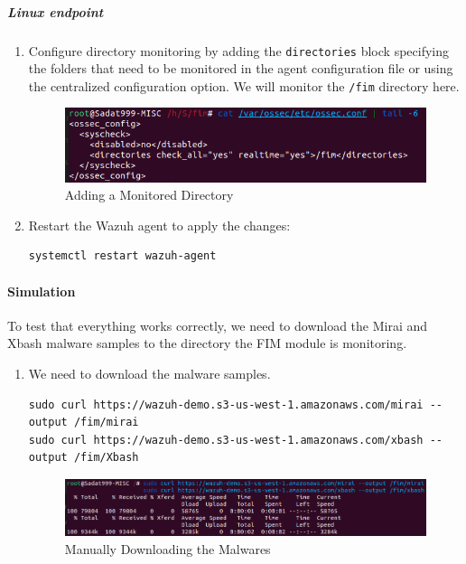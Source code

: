 \subparagraph{Linux endpoint}
\label{fim-source}
\begin{enumerate}
    \item Configure directory monitoring by adding the \texttt{\textlangle directories\textrangle} block specifying the folders that need to be monitored in the agent configuration file or using the centralized configuration option. We will monitor the \texttt{/fim} directory here.
    \begin{figure}[H]
        \centering
        \includegraphics[width=\textwidth]{images/malware-detection/cdb/5.png}
        \caption{Adding a Monitored Directory}
        \label{fig:monitored-dir}
    \end{figure}

    \item Restart the Wazuh agent to apply the changes:
    \begin{verbatim}
systemctl restart wazuh-agent
    \end{verbatim}
\end{enumerate}

\paragraph{Simulation}
To test that everything works correctly, we need to download the Mirai and Xbash malware samples to the directory the FIM module is monitoring.
\begin{enumerate}
    \item We need to download the malware samples.
    \begin{verbatim}
sudo curl https://wazuh-demo.s3-us-west-1.amazonaws.com/mirai --output /fim/mirai
sudo curl https://wazuh-demo.s3-us-west-1.amazonaws.com/xbash --output /fim/Xbash
    \end{verbatim}

    \begin{figure}[H]
        \centering
        \includegraphics[width=\textwidth]{images/malware-detection/cdb/7.png}
        \caption{Manually Downloading the Malwares}
        \label{fig:malware-download}
    \end{figure}
\end{enumerate}

